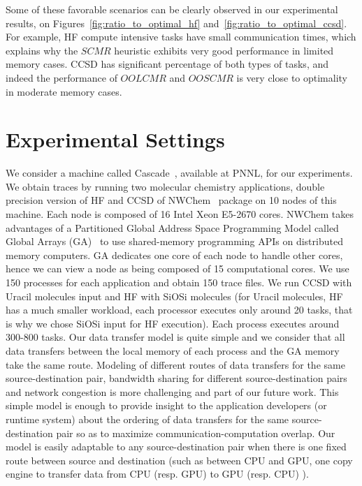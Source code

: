 \documentclass[runningheads]{llncs} %
\begin{document}
			Some of these favorable scenarios can be clearly observed in our experimental results, on Figures~\ref{fig:ratio_to_optimal_hf} and~\ref{fig:ratio_to_optimal_ccsd}. For example, HF compute intensive tasks have small communication times, which explains why the $SCMR$ heuristic exhibits very good performance in limited memory cases. CCSD has significant percentage of both types of tasks, and indeed the performance of $OOLCMR$ and $OOSCMR$ is very close to optimality in moderate memory cases. 
	
	\section{Experimental Settings}
	\label{sec:expSetting}
	

We consider a machine called Cascade~\cite{Cascade}, available at PNNL, for our experiments. We obtain traces by running two molecular chemistry applications, double precision version of  HF and CCSD of NWChem~\cite{NWChem} package on 10 nodes of this machine. Each node is composed of 16 Intel Xeon E5-2670 cores. NWChem takes advantages of a Partitioned Global Address Space Programming Model called Global Arrays (GA)~\cite{GlobalArray} to use shared-memory programming APIs on distributed memory computers. GA dedicates one core of each node to handle other cores, hence we can view a node as being composed of 15 computational cores. We use 150 processes for each application and obtain 150 trace files. We run CCSD with Uracil molecules input and HF with SiOSi molecules (for Uracil molecules, HF has a much smaller workload, each processor executes only around 20 tasks, that is why we chose SiOSi input for HF execution). Each process executes around 300-800 tasks. Our data transfer model is quite simple and we consider that all data transfers between the local memory of each process and the GA memory take the same route. Modeling of different routes of data transfers for the same source-destination pair, bandwidth sharing for different source-destination pairs and network congestion is more challenging and part of our future work. This simple model is enough to provide insight to the application developers (or runtime system) about the ordering of data transfers for the same source-destination pair so as to maximize communication-computation overlap. Our model is easily adaptable to any source-destination pair when there is one fixed route between source and destination (such as between CPU and GPU, one copy engine to transfer data from CPU (resp. GPU) to GPU (resp. CPU) ).
\end{document}
